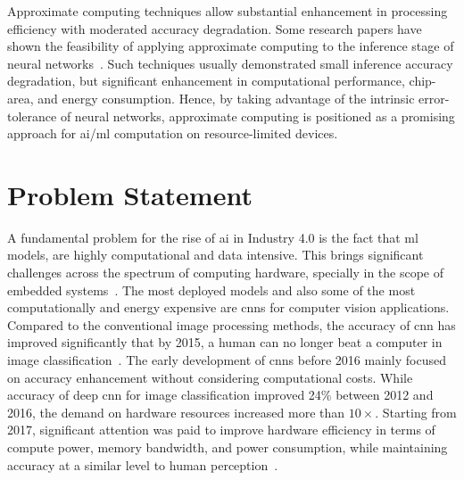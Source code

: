 Approximate computing techniques allow substantial enhancement in processing efficiency with moderated accuracy degradation. Some research papers have shown the feasibility of applying approximate computing to the inference stage of neural networks~\cite{lotrivc2012applicability, han2013approximate, du2014leveraging, mrazek2016design, sarwar2016multiplier, zervakis2021approximate}. Such techniques usually demonstrated small inference accuracy degradation, but significant enhancement in computational performance, chip-area, and energy consumption. Hence, by taking advantage of the intrinsic error-tolerance of neural networks, approximate computing is positioned as a promising approach for \gls{ai}/\gls{ml} computation on resource-limited devices.

\section{Problem Statement}
A fundamental problem for the rise of \gls{ai} in Industry 4.0 is the fact that \gls{ml} models, are highly computational and data intensive. This brings significant challenges across the spectrum of computing hardware, specially in the scope of embedded systems~\cite{venkataramani2016efficient}. The most deployed models and also some of the most computationally and energy expensive are \glspl{cnn} for computer vision applications. Compared to the conventional image processing methods, the accuracy of \gls{cnn} has improved significantly that by 2015, a human can no longer beat a computer in image classification~\cite{loh20201}. The early development of \glspl{cnn} before 2016 mainly focused on accuracy enhancement without considering computational costs. While accuracy of deep \gls{cnn} for image classification improved 24\% between 2012 and 2016, the demand on hardware resources increased more than $10\times$. Starting from 2017, significant attention was paid to improve hardware efficiency in terms of compute power, memory bandwidth, and power consumption, while maintaining accuracy at a similar level to human perception~\cite{venkataramani2016efficient}.

